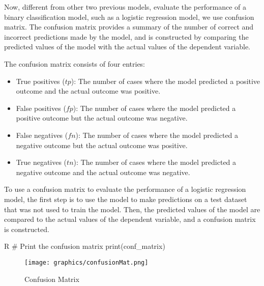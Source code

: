 Now, different from other two previous models, evaluate the performance of a binary classification model, such as a logistic regression model, we use confusion matrix. The confusion matrix provides a summary of the number of correct and incorrect predictions made by the model, and is constructed by comparing the predicted values of the model with the actual values of the dependent variable.
The confusion matrix consists of four entries:
\begin{itemize}
    \item  True positives ($tp$): The number of cases where the model predicted a positive outcome and the actual outcome was positive.
    \item False positives ($fp$): The number of cases where the model predicted a positive outcome but the actual outcome was negative.
    \item False negatives ($fn$): The number of cases where the model predicted a negative outcome but the actual outcome was positive.
    \item True negatives ($tn$): The number of cases where the model predicted a negative outcome and the actual outcome was negative.
\end{itemize}

To use a confusion matrix to evaluate the performance of a logistic regression model, the first step is to use the model to make predictions on a test dataset that was not used to train the model. Then, the predicted values of the model are compared to the actual values of the dependent variable, and a confusion matrix is constructed.
\begin{code}{R}
# Print the confusion matrix
print(conf_matrix)
\end{code}
\begin{figure}[H]
    \centering
    \texttt{[image: graphics/confusionMat.png]}
    \caption{Confusion Matrix}
    \label{fig:conf}
\end{figure}
\noindent 

